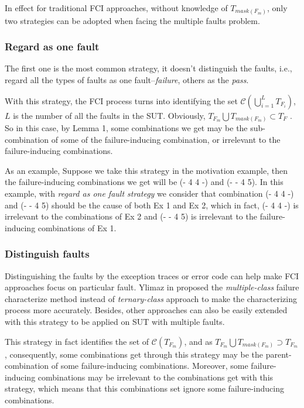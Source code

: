 \documentclass{sig-alternate}
\begin{document}
In effect for traditional FCI approaches, without knowledge of  $T_{mask(F_{m})}$,  only two strategies can be adopted when facing the multiple faults problem.

\subsubsection{Regard as one fault}
The first one is the most common strategy, it doesn't distinguish the faults, i.e., regard all the types of faults as one fault--\emph{failure}, others as the \emph{pass}.

With this strategy, the FCI process turns into identifying the set $\mathcal{C}(\bigcup_{i = 1}^{L}T_{F_{i}})$, $L$ is the number of all the faults in the SUT. Obviously, $T_{F_{m}} \bigcup T_{mask(F_{m})} \subset T_{F}$ . So in this case, by Lemma 1, some combinations we get may be the sub-combination of some of the failure-inducing combination, or irrelevant to the failure-inducing combinations.

As an example, Suppose we take this strategy in the motivation example, then the failure-inducing combinations we get will be (- 4 4 -) and (- - 4 5). In this example, with \emph{regard as one fault strategy} we consider that combination (- 4 4 -) and (- - 4 5) should be the cause of both Ex 1 and Ex 2, which in fact, (- 4 4 -) is irrelevant to the combinations of Ex 2 and (- - 4 5) is irrelevant to the failure-inducing combinations of Ex 1.

\subsubsection{Distinguish faults}
Distinguishing the faults by the exception traces or error code can help make FCI approaches focus on particular fault. Ylimaz in  \cite{yilmaz2013reducing} proposed the \emph{multiple-class} failure characterize method instead of \emph{ternary-class} approach to make the characterizing process more accurately. Besides, other approaches can also be easily extended with this strategy to be applied on SUT with multiple faults.

This strategy in fact identifies the set of $\mathcal{C}(T_{F_{m}})$, and as $T_{F_{m}} \bigcup T_{mask(F_{m})} \supset T_{F_{m}} $, consequently, some combinations get through this strategy may be the parent-combination of some failure-inducing combinations. Moreover, some failure-inducing combinations may be irrelevant to the combinations get with this strategy, which means that this combinations set ignore some failure-inducing combinations.
\end{document}
